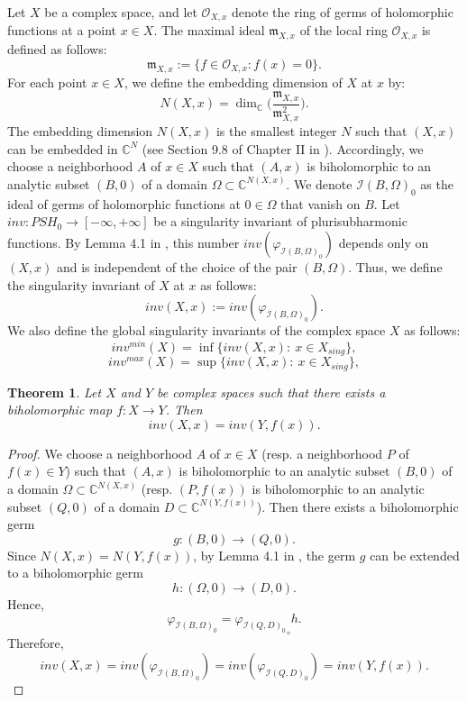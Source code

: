 \documentclass[a4paper,oneside,reqno,11pt]{article}
\newtheorem{theorem}{Theorem}[section]
\begin{document}
Let $X$ be a complex space, and let $\mathcal{O}_{X, x} $ denote the ring of germs of holomorphic functions at a point $x\in X$. The maximal ideal $\mathfrak{m}_{X,x}$ of the local ring $\mathcal{O}_{X, x} $ is defined as follows:
$$\mathfrak{m}_{X,x} := \{ f \in \mathcal{O}_{X, x} : f(x) = 0 \}.$$
For each point $x\in X$, we define the embedding dimension of $X$ at $x$ by: 
$$N(X,x) = \dim_{ \mathbb C } \big(  \frac {  \mathfrak{m}_{X,x} } {  \mathfrak{m}_{X,x}^2 } \big).$$
The embedding dimension $N(X,x)$ is the smallest integer $N$ such that $(X,x)$ can be embedded in $\mathbb C^N$ (see Section 9.8 of Chapter II in \cite{De12}). Accordingly, we choose a neighborhood $A$ of $x\in X$ such that $(A,x)$ is biholomorphic to an analytic subset $(B,0)$ of a domain $\Omega \subset \mathbb{C}^{N(X,x)} $. We denote $\mathcal{I}(B, \Omega)_0$ as the ideal of germs of holomorphic functions at $0 \in \Omega$ that vanish on $B$. Let $inv : PSH_0 \to [-\infty, +\infty]$ be a singularity invariant of plurisubharmonic functions. By Lemma 4.1 in \cite{Wh65}, this number $inv( \varphi_{\mathcal{I}(B, \Omega)_0} )$ depends only on $(X,x)$ and  is independent of the choice of the pair $(B, \Omega )$. Thus, we define the singularity invariant of $X$ at $x$ as follows:
$$inv(X, x) := inv( \varphi_{\mathcal{I}(B, \Omega)_0} ).$$
We also define the global singularity invariants of the complex space $X$ as follows:
$$inv^{min} (X) = \inf \{ inv (X, x):\ x\in X_{sing} \},$$ 
$$inv^{max} (X) = \sup \{ inv (X, x):\ x\in X_{sing} \},$$ 

\begin{theorem}\label{Theorem3} 
Let $X$ and $Y$ be complex spaces such that there exists a biholomorphic map $f:X\to Y$. Then 
$$inv ( X, x ) = inv ( Y, f ( x ) ).$$
\end{theorem}

\begin{proof}
We choose a neighborhood $A$ of $x\in X$ (resp. a neighborhood $P$ of $f(x)\in Y$) such that $(A,x)$ is biholomorphic to an analytic subset $(B,0)$ of a domain $\Omega \subset \mathbb{C}^{N(X,x)}$ (resp. $(P, f(x) )$ is biholomorphic to an analytic subset $(Q,0)$ of a domain $D \subset \mathbb{C}^{N(Y, f(x) )}$). Then there exists a biholomorphic germ 
$$g: (B,0) \to (Q,0).$$ 
Since $N(X,x) = N(Y, f ( x ) )$, by Lemma 4.1 in \cite{Wh65}, the germ $g$ can be extended to a biholomorphic germ 
$$h: (\Omega , 0)\to (D, 0).$$ 
Hence,
$$\varphi_{\mathcal{I}(B, \Omega)_0} = { \varphi_{\mathcal{I}(Q, D)_0} }_\circ h.$$
Therefore,
$$inv ( X, x ) = inv( \varphi_{\mathcal{I}(B, \Omega)_0} ) = inv( \varphi_{\mathcal{I}(Q, D)_0} ) = inv ( Y, f ( x ) ).$$
\end{proof}
\end{document}
